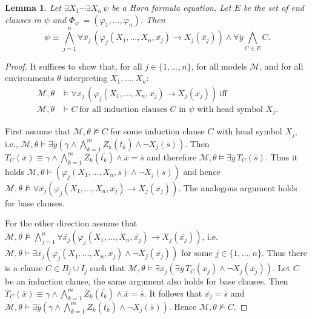 \documentclass[acmsmall]{acmart}
\theoremstyle{plain}
\newtheorem{lemma}[theorem]{Lemma}
\theoremstyle{definition}
\newcommand{\calM}{\mathcal{M}}
\newcommand{\mybar}[1]{\overline{#1}}
\newcommand{\impl}{\rightarrow} %
\newcommand{\Land}{\bigwedge}
\begin{document}
\begin{lemma}\label{lem.Hornformula.split}
	Let  $\exists X_1 \cdots \exists X_n\, \psi$ be a Horn formula equation. Let $E$ be the set of end clauses in $\psi$ and $\Phi_{\psi}\ =(\varphi_1,...,\varphi_n)$. Then
	\[
	\psi \equiv \bigwedge_{j=1}^n \forall \mybar{x_j}\, (\varphi_j(X_1,...,X_n,\mybar{x_j}) \impl X_j(\mybar{x_j})) \wedge \forall \mybar{y} \bigwedge_{C \in E} C.
	\]
\end{lemma}
\begin{proof}
It suffices to show that, for all $j \in \{ 1,\ldots,n \}$, for all models $\calM$, and
 for all environments $\theta$ interpreting $X_1,\ldots,X_n$:
\begin{align*}
 \calM, \theta & \models \forall \mybar{x_j}\, (\varphi_j(X_1,...,X_n,\mybar{x_j}) \impl X_j(\mybar{x_j}))\ \text{iff} \\
 \calM, \theta & \models C\ \text{for all induction clauses $C$ in $\psi$ with head symbol $X_j$.}
\end{align*}
%
%

First assume that $\calM,\theta \not\models C$ for some induction clause $C$ with head
 symbol $X_j$, i.e.,  $\calM, \theta \models \exists \mybar{y} (\gamma \land \Land_{k = 1}^{m}  Z_{k}(\mybar{t_k}) \wedge \neg X_{j}(\mybar{s}))$.
	Then $T_C(\mybar{x}) \equiv \gamma \land\Land_{k = 1}^{m}  Z_{k}(\mybar{t_k}) \land \mybar{x} = \mybar{s}$ and therefore $\calM, \theta \models \exists \mybar{y}\, T_C(\mybar{s})$.
	Thus it holds $\calM, \theta \models (\varphi_j(X_1,...,X_n,\mybar{s}) \wedge \neg X_j(\mybar{s}))$ and hence $\calM, \theta \not\models \forall \mybar{x_j} (\varphi_j(X_1,...,X_n,\mybar{x_j}) \impl X_j(\mybar{x_j}))$. The analogous argument holds for base clauses.
	
	For the other direction assume that $\calM,\theta \not\models \bigwedge_{j=1}^n \forall \mybar{x_j} (\varphi_j(X_1,...,X_n,\mybar{x_j}) \impl X_j(\mybar{x_j}))$, i.e. $\calM,\theta \models \exists \mybar{x_j} (\varphi_j(X_1,...,X_n,\mybar{x_j}) \land \neg X_j(\mybar{x_j}))$ for some $j \in \{1,...,n\}$. Thus there is a clause $C \in B_j \cup I_j$ such that $\calM,\theta \models \exists \mybar{x_j}(\exists \mybar{y}\, T_C(\mybar{x_j}) \land \neg X_j(\mybar{x_j}))$. Let $C$ be an induction clause, the same argument also holds for base clauses. Then $T_C(\mybar{x}) \equiv \gamma \land\Land_{k = 1}^{m}  Z_{k}(\mybar{t_k}) \land \mybar{x} = \mybar{s}$. It follows that $\mybar{x_j} = \mybar{s}$ and $\calM,\theta \models \exists \mybar{y} (\gamma \land \Land_{k = 1}^{m}  Z_{k}(\mybar{t_k}) \land \neg X_j(\mybar{s}))$. Hence $\calM,\theta \not\models C$.
\end{proof}
\end{document}
